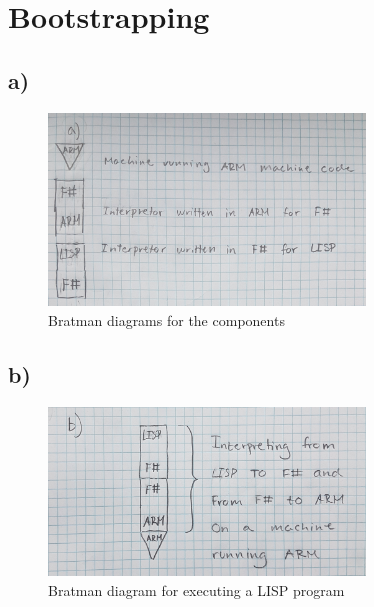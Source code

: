 \section{Bootstrapping}

\subsection{a)}
\begin{figure}[H]
    \centering
    \includegraphics[width=0.75\textwidth]{Figures/PLD_A1_Q3_A_cropped.jpg}
    \caption{Bratman diagrams for the components}
\end{figure}

\subsection{b)}

\begin{figure}[H]
    \centering
    \includegraphics[width=0.75\textwidth]{Figures/PLD_A1_Q3_B_cropped.jpg}
    \caption{Bratman diagram for executing a LISP program}
\end{figure}